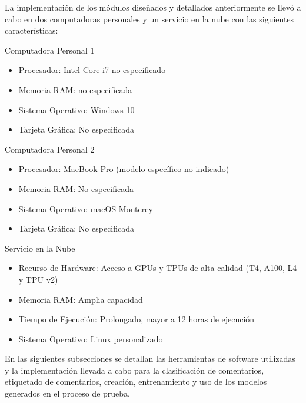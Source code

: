 La implementación de los módulos diseñados y detallados anteriormente se llevó a cabo en dos computadoras personales y un servicio en la nube con las siguientes características:

Computadora Personal 1

\begin{itemize}

\item Procesador: Intel Core i7 no especificado
\item Memoria RAM: no especificada
\item Sistema Operativo: Windows 10
\item Tarjeta Gráfica: No especificada

\end{itemize}

Computadora Personal 2

\begin{itemize}

\item Procesador: MacBook Pro (modelo específico no indicado)
\item Memoria RAM: No especificada
\item Sistema Operativo: macOS Monterey
\item Tarjeta Gráfica: No especificada

\end{itemize}

Servicio en la Nube

\begin{itemize}

\item Recurso de Hardware: Acceso a GPUs y TPUs de alta calidad (T4, A100, L4 y TPU v2)
\item Memoria RAM: Amplia capacidad
\item Tiempo de Ejecución: Prolongado, mayor a 12 horas de ejecución
\item Sistema Operativo: Linux personalizado

\end{itemize}

En las siguientes subsecciones se detallan las herramientas de software utilizadas y la implementación llevada a cabo para la clasificación de comentarios, etiquetado de comentarios, creación, entrenamiento y uso de los modelos generados en el proceso de prueba.
